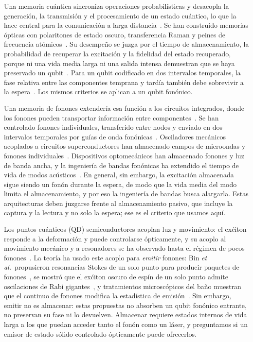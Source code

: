 \documentclass[aps,pra,twocolumn,groupedaddress,amsmath,amssymb,floatfix]{revtex4-2}
\begin{document}
Una memoria cu\'antica sincroniza operaciones probabil\'isticas y desacopla la generaci\'on, la transmisi\'on y el procesamiento de un estado cu\'antico, lo que la hace central para la comunicaci\'on a larga distancia~\cite{duan2001}. Se han construido memorias \'opticas con polaritones de estado oscuro, transferencia Raman y peines de frecuencia at\'omicos~\cite{fleischhauer2002,gorshkov2007,afzelius2009}. Su desempe\~no se juzga por el tiempo de almacenamiento, la probabilidad de recuperar la excitaci\'on y la fidelidad del estado recuperado, porque ni una vida media larga ni una salida intensa demuestran que se haya preservado un qubit~\cite{hedges2010,ortu2022,wang2019}. Para un qubit codificado en dos intervalos temporales, la fase relativa entre las componentes temprana y tard\'ia tambi\'en debe sobrevivir a la espera~\cite{ortu2022}. Los mismos criterios se aplican a un qubit fon\'onico.

Una memoria de fonones extender\'ia esa funci\'on a los circuitos integrados, donde los fonones pueden transportar informaci\'on entre componentes~\cite{habraken2012,schuetz2015}. Se han controlado fonones individuales, transferido entre nodos y enviado en dos intervalos temporales por gu\'ias de onda fon\'onicas~\cite{satzinger2018,bienfait2019,dumur2021,zivariWaveguide2022,zivariTimebin2022}. Osciladores mec\'anicos acoplados a circuitos superconductores han almacenado campos de microondas y fonones individuales~\cite{oconnell2010,chu2017,palomaki2013,liu2023,reed2017}. Dispositivos optomec\'anicos han almacenado fonones y luz de banda ancha, y la ingenier\'ia de bandas fon\'onicas ha extendido el tiempo de vida de modos ac\'usticos~\cite{galland2014,wallucks2020,england2013,macCabe2020,taylor2022,bozkurt2025}. En general, sin embargo, la excitaci\'on almacenada sigue siendo un fon\'on durante la espera, de modo que la vida media del modo limita el almacenamiento, y por eso la ingenier\'ia de bandas busca alargarla. Estas arquitecturas deben juzgarse frente al almacenamiento pasivo, que incluye la captura y la lectura y no solo la espera; ese es el criterio que usamos aqu\'i.

Los puntos cu\'anticos (QD) semiconductores acoplan luz y movimiento: el ex\'citon responde a la deformaci\'on y puede controlarse \'opticamente, y su acoplo al movimiento mec\'anico y a resonadores se ha observado hasta el r\'egimen de pocos fonones~\cite{kettler2021,spinnler2024}. La teor\'ia ha usado este acoplo para \emph{emitir} fonones: Bin \emph{et al.}\ propusieron resonancias Stokes de un solo punto para producir paquetes de fonones~\cite{bin2020}, se mostr\'o que el ex\'citon oscuro de esp\'in de un solo punto admite oscilaciones de Rabi gigantes~\cite{vargas2022}, y tratamientos microsc\'opicos del ba\~no muestran que el continuo de fonones modifica la estad\'istica de emisi\'on~\cite{cosacchi2022}. Sin embargo, emitir no es almacenar: estas propuestas no absorben un qubit fon\'onico entrante, no preservan su fase ni lo devuelven. Almacenar requiere estados internos de vida larga a los que puedan acceder tanto el fon\'on como un l\'aser, y preguntamos si un emisor de estado s\'olido controlado \'opticamente puede ofrecerlos.
\end{document}
